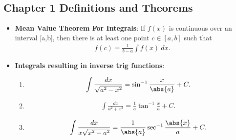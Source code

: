 \documentclass{report}
\begin{document}
    \subsection{Chapter 1 Definitions and Theorems}
    \bigbreak \noindent 
    \begin{itemize}
        \item \textbf{Mean Value Theorem For Integrals}: If  $f(x)$ is continuous over an interval  [a,b], then there is at least one point  $c\in[a,b]$ such that 
            \begin{align*}
                f(c) = \frac{1}{b-a}\int f(x)\ dx
            .\end{align*}
        \item \textbf{Integrals resulting in inverse trig functions}:
            \begin{enumerate}
                \item \begin{align*}
                        \int \frac{dx}{\sqrt{a^{2}-x^{2}}} = \sin^{-1}{\frac{x}{\abs{a}}} + C
                    .\end{align*}
                \item \begin{align*}
                        \int \frac{dx}{a^{2}+x^{2}} = \frac{1}{a}\tan^{-1}{\frac{x}{a}} + C
                    .\end{align*}
                \item \begin{align*}
                        \int \frac{dx}{x\sqrt{x^{2}-a^{2}}} = \frac{1}{\abs{a}}\sec^{-1}{\frac{\abs{x}}{a}} + C
                    .\end{align*}
            \end{enumerate}
    \end{itemize}
\end{document}
